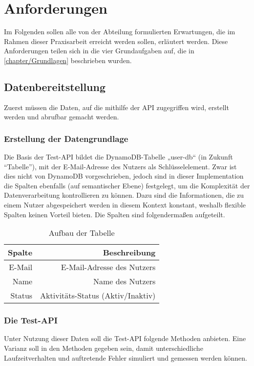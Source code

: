 \section{Anforderungen}
Im Folgenden sollen alle von der Abteilung formulierten Erwartungen, die im Rahmen dieser Praxisarbeit erreicht werden sollen, erläutert werden. Diese Anforderungen teilen sich in die vier Grundaufgaben auf, die in \ref{chapter/Grundlagen} beschrieben wurden.
\subsection{Datenbereitstellung}
Zuerst müssen die Daten, auf die mithilfe der API zugegriffen wird, erstellt werden und abrufbar gemacht werden.
\subsubsection{Erstellung der Datengrundlage}
Die Basis der Test-API bildet die DynamoDB-Tabelle „user-db“ (in Zukunft ``Tabelle''), mit der E-Mail-Adresse des Nutzers als Schlüsselelement. Zwar ist dies nicht von DynamoDB vorgeschrieben, jedoch sind in dieser Implementation die Spalten ebenfalls (auf semantischer Ebene) festgelegt, um die Komplexität der Datenverarbeitung kontrollieren zu können.  Dazu sind die Informationen, die zu einem Nutzer abgespeichert werden in diesem Kontext konstant, weshalb flexible Spalten keinen Vorteil bieten. \newpage 
Die Spalten sind folgendermaßen aufgeteilt.

\begin{table}[hbt]
\centering
\begin{minipage}[t]{.5\textwidth} %
\caption{Aufbau der Tabelle} %
\begin{tabularx}{\columnwidth}{rr}
\toprule
Spalte & Beschreibung\\
\midrule
E-Mail & E-Mail-Adresse des Nutzers\\
Name   & Name des Nutzers\\
Status & Aktivitäts-Status (Aktiv/Inaktiv)\\
\bottomrule
\end{tabularx}
\label{tab:schema}
\end{minipage}
\end{table}
\subsubsection{Die Test-API}
Unter Nutzung dieser Daten soll die Test-API folgende Methoden anbieten. Eine Varianz soll in den Methoden gegeben sein, damit unterschiedliche Laufzeitverhalten und auftretende Fehler simuliert und gemessen werden können.
